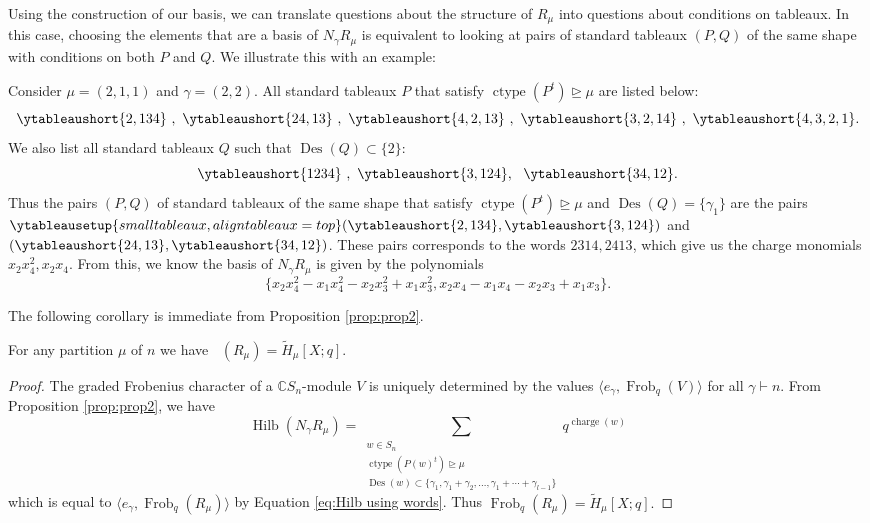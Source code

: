 \documentclass[ALCO, Unicode]{cedram}
\DeclareMathOperator{\charge}{charge}
\DeclareMathOperator{\ctype}{ctype}
\DeclareMathOperator{\Frob}{Frob}
\DeclareMathOperator{\Hilb}{Hilb}
\DeclareMathOperator{\des}{Des}
\DeclareMathOperator{\Frobq}{\Frob_q}
\newcommand{\mHL}{\tilde{H}}
\begin{document}
Using the construction of our basis, we can translate questions about the structure of $R_{\mu}$ into questions about conditions on tableaux.
In this case, choosing the elements that are a basis of $N_\gamma R_{\mu}$ is equivalent to looking at pairs of standard tableaux $(P,Q)$ of the same shape with conditions on both $P$ and $Q$. 
We illustrate this with an example:
\begin{ex}
Consider $\mu= (2,1,1)$ and $\gamma = (2,2)$. All standard tableaux $P$ that satisfy $\ctype(P^t) \unrhd \mu$ are listed below:
\[\ytableaushort{2,134} \ , \  \ytableaushort{24,13} \ , \ \ytableaushort{4,2,13} \ , \  \ytableaushort{3,2,14}\ , \ \ytableaushort{4,3,2,1}. \]
We also list all standard tableaux $Q$ such that $\des(Q) \subset \{2\}$:
\[\ytableaushort{1234} \ , \  \ytableaushort{3,124}, \ \ \ytableaushort{34,12}. \]
Thus the pairs $(P,Q)$ of standard tableaux of the same shape that satisfy $\ctype(P^t) \unrhd \mu$ and $\des(Q) = \{\gamma_1\}$ are the pairs $ \ytableausetup{smalltableaux,  aligntableaux = top}(\ytableaushort{2,134},\ytableaushort{3,124})$ and $(\ytableaushort{24,13},\ytableaushort{34,12})$.
These pairs corresponds to the words $2314, 2413$, which give us the charge monomials $x_2x_4^2, x_2x_4.$
From this, we know the basis of $N_\gamma R_{\mu}$ is given by the polynomials
\[\{ x_2x_4^2 - x_1x_4^2 - x_2x_3^2 + x_1x_3^2, x_2x_4 - x_1x_4 - x_2x_3 + x_1x_3 \}.\]

\end{ex}

The following corollary is immediate from Proposition \ref{prop:prop2}.

\begin{coro}
For any partition $\mu$ of $n$ we have $\Frobq(R_{\mu}) =\mHL_{\mu}[X;q].$
\end{coro}
\begin{proof}
The graded Frobenius character of a $\mathbb{C}S_n$-module $V$ is uniquely determined by the values $\langle e_\gamma , \Frob_q(V)\rangle$ for all $\gamma\vdash n$.
From Proposition \ref{prop:prop2}, we have
\[\Hilb(N_\gamma R_{\mu})  = \sum\limits_{\substack{w\in S_n\\  \ctype(P(w)^t)\unrhd\mu \\ \des(w) \subset \{\gamma_1,\gamma_1 + \gamma_2, \dots, \gamma_1 +\cdots + \gamma_{l-1}\} }}  q^{\charge(w)} \]
which is equal to $\langle e_\gamma , \Frob_q(R_{\mu})\rangle$ by Equation \eqref{eq:Hilb using words}. Thus $\Frob_q(R_{\mu}) = \mHL_{\mu}[X;q].$
\end{proof}
\end{document}
